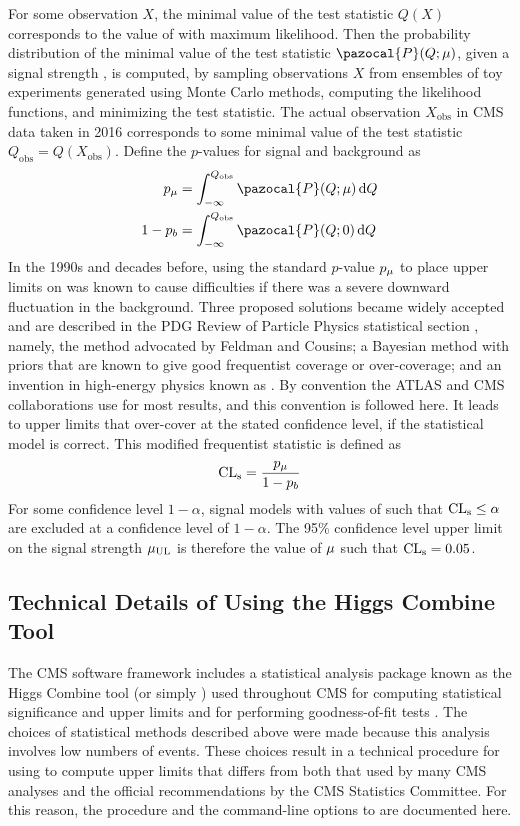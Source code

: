 For some observation $X$, the minimal value of the test statistic $Q(X)$ corresponds to the value of \sigstr with maximum likelihood.
Then the probability distribution of the minimal value of the test statistic $\pazocal{P}(Q;\sigstr)$, given a signal strength \sigstr, is computed, by sampling observations $X$ from ensembles of toy experiments generated using Monte Carlo methods, computing the likelihood functions, and minimizing the test statistic.
The actual observation $X_\text{obs}$ in CMS data taken in 2016 corresponds to some minimal value of the test statistic $Q_\text{obs} = Q(X_\text{obs})$.
Define the $p$-values for signal and background as
\begin{align}
  p_\sigstr   &= \int_{-\infty}^{Q_\text{obs}}{\pazocal{P}(Q;\sigstr)\dd{Q}}\\
  1 - p_b     &= \int_{-\infty}^{Q_\text{obs}}{\pazocal{P}(Q;0)      \dd{Q}}
  \label{eq:dd:pvalues}
\end{align}
In the 1990s and decades before, using the standard $p$-value $p_\mu$ to place upper limits on \sigstr was known to cause difficulties if there was a severe downward fluctuation in the background.
Three proposed solutions became widely accepted and are described in the PDG Review of Particle Physics statistical section \cite{CowanPDGStats}, namely, the method advocated by Feldman and Cousins; a Bayesian method with priors that are known to give good frequentist coverage or over-coverage; and an invention in high-energy physics known as \CLs.
By convention the ATLAS and CMS collaborations use \CLs \cite{Read:CLs, Junk:CLs} for most results, and this convention is followed here.
It leads to upper limits that over-cover at the stated confidence level, if the statistical model is correct.
This modified frequentist statistic \CLs is defined as
\begin{equation}
  \text{CL}_\text{s} = \frac{p_\mu}{1-p_b}
  \label{eq:CLs}
\end{equation}
For some confidence level $1-\alpha$, signal models with values of \CLs such that $\text{CL}_\text{s} \leq \alpha$ are excluded at a confidence level of $1-\alpha$.
The 95\% confidence level upper limit on the signal strength $\mu_\text{UL}$ is therefore the value of $\mu$ such that $\text{CL}_\text{s} = 0.05$.

\subsection{Technical Details of Using the Higgs Combine Tool}
\label{sec:dd:combine}
The CMS software framework includes a statistical analysis package known as the Higgs Combine tool (or simply \combine) used throughout CMS for computing statistical significance and upper limits and for performing goodness-of-fit tests \cite{CombineManual}.
The choices of statistical methods described above were made because this analysis involves low numbers of events.
These choices result in a technical procedure for using \combine to compute upper limits that differs from both that used by many CMS analyses and the official recommendations by the CMS Statistics Committee.
For this reason, the procedure and the command-line options to \combine are documented here.

